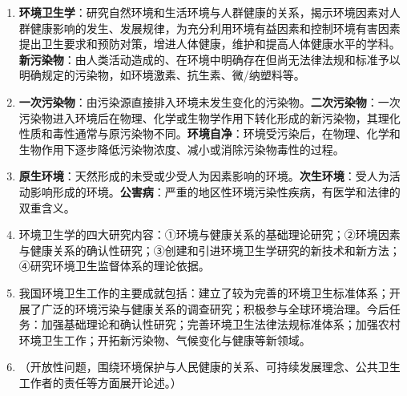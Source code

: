 \begin{enumerate}[leftmargin=*, itemsep=5pt]
    \item \textbf{环境卫生学}：研究自然环境和生活环境与人群健康的关系，揭示环境因素对人群健康影响的发生、发展规律，为充分利用环境有益因素和控制环境有害因素提出卫生要求和预防对策，增进人体健康，维护和提高人体健康水平的学科。\textbf{新污染物}：由人类活动造成的、在环境中明确存在但尚无法律法规和标准予以明确规定的污染物，如环境激素、抗生素、微/纳塑料等。

    \item \textbf{一次污染物}：由污染源直接排入环境未发生变化的污染物。\textbf{二次污染物}：一次污染物进入环境后在物理、化学或生物学作用下转化形成的新污染物，其理化性质和毒性通常与原污染物不同。\textbf{环境自净}：环境受污染后，在物理、化学和生物作用下逐步降低污染物浓度、减小或消除污染物毒性的过程。

    \item \textbf{原生环境}：天然形成的未受或少受人为因素影响的环境。\textbf{次生环境}：受人为活动影响形成的环境。\textbf{公害病}：严重的地区性环境污染性疾病，有医学和法律的双重含义。

    \item 环境卫生学的四大研究内容：①环境与健康关系的基础理论研究；②环境因素与健康关系的确认性研究；③创建和引进环境卫生学研究的新技术和新方法；④研究环境卫生监督体系的理论依据。

    \item 我国环境卫生工作的主要成就包括：建立了较为完善的环境卫生标准体系；开展了广泛的环境污染与健康关系的调查研究；积极参与全球环境治理。今后任务：加强基础理论和确认性研究；完善环境卫生法律法规标准体系；加强农村环境卫生工作；开拓新污染物、气候变化与健康等新领域。

    \item （开放性问题，围绕环境保护与人民健康的关系、可持续发展理念、公共卫生工作者的责任等方面展开论述。）
\end{enumerate}

\newpage

\newpage